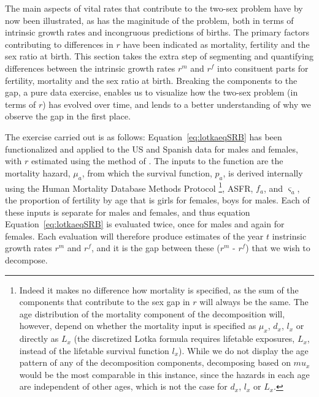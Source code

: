  \FloatBarrier
\label{sec:Decompr}
The main aspects of vital rates that contribute to the two-sex problem have by
now been illustrated, as has the maginitude of the problem, both in terms of
intrinsic growth rates and incongruous predictions of births. The primary
factors contributing to differences in $r$ have been indicated as mortality, fertility
and the sex ratio at birth. This section takes the extra step of segmenting and
quantifying differences between the intrinsic growth rates $r^m$ and $r^f$ into
consituent parts for fertility, mortality and the sex ratio at birth. Breaking the 
components to the gap, a pure data exercise, enables us to
visualize how the two-sex problem (in terms of $r$) has evolved over time, and
lends to a better understanding of why we observe the gap in the first place.

The exercise carried out is as follows: Equation~\eqref{eq:lotkaeqSRB} has been
functionalized and applied to the US and Spanish data for males and females,
with $r$ estimated using the method of \citet{coale1957new}. The inputs to the
function are the mortality hazard, $\mu_a$, from which the survival function,
$p_a$, is derived internally using the Human Mortality Database Methods
Protocol \citep{wilmoth2007methods}\footnote{Indeed it makes no difference how
mortality is specified, as the sum of the components that contribute to the
sex gap in $r$ will always be the same. The age distribution of the mortality
component of the decomposition will, however, depend on whether the
mortality input is specified as $\mu_x$, $d_x$, $l_x$ or directly as $L_x$ (the
discretized Lotka formula requires lifetable exposures, $L_x$, instead of the 
lifetable survival function $l_x$). While we do not display the age pattern of
any of the decomposition components, decomposing based on $mu_x$ would be the
most comparable in this instance, since the hazards in each age are independent
of other ages, which is not the case for $d_x$, $l_x$ or $L_x$.}, ASFR, $f_a$,
and $\varsigma _a$, the proportion of fertility by age that is girls for females, boys for males.
Each of these inputs is separate for males and females, and thus equation
Equation~\eqref{eq:lotkaeqSRB} is evaluated twice, once for males and again for
females. Each evaluation will therefore produce estimates of the year $t$
instrinsic growth rates $r^m$ and $r^f$, and it is the gap between
these ($r^m$ - $r^f$) that we wish to decompose.

